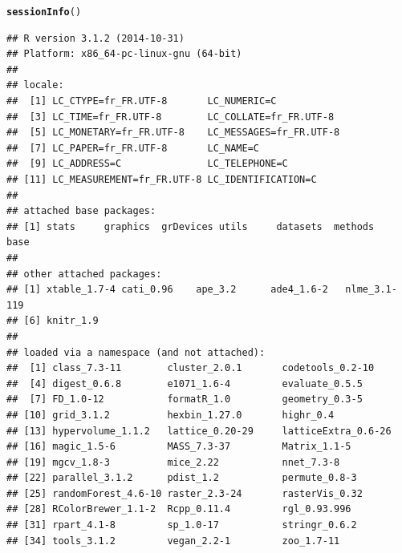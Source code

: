 \documentclass[12pt]{article}\usepackage[]{graphicx}\usepackage[]{color}
\makeatletter
\newcommand{\hlstd}[1]{\textcolor[rgb]{0.345,0.345,0.345}{#1}}%
\newcommand{\hlkwd}[1]{\textcolor[rgb]{0.737,0.353,0.396}{\textbf{#1}}}%
\newenvironment{kframe}{%
 \def\at@end@of@kframe{}%
 \ifinner\ifhmode%
  \def\at@end@of@kframe{\end{minipage}}%
  \begin{minipage}{\columnwidth}%
 \fi\fi%
 \def\FrameCommand##1{\hskip\@totalleftmargin \hskip-\fboxsep
 \colorbox{shadecolor}{##1}\hskip-\fboxsep
     \hskip-\linewidth \hskip-\@totalleftmargin \hskip\columnwidth}%
 \MakeFramed {\advance\hsize-\width
   \@totalleftmargin\z@ \linewidth\hsize
   \@setminipage}}%
 {\par\unskip\endMakeFramed%
 \at@end@of@kframe}
\newenvironment{knitrout}{}{} %
\makeatother
\begin{document}
\begin{knitrout}\small
{}\color{fgcolor}\begin{kframe}
\begin{alltt}
\hlkwd{sessionInfo}\hlstd{()}
\end{alltt}
\begin{verbatim}
## R version 3.1.2 (2014-10-31)
## Platform: x86_64-pc-linux-gnu (64-bit)
## 
## locale:
##  [1] LC_CTYPE=fr_FR.UTF-8       LC_NUMERIC=C              
##  [3] LC_TIME=fr_FR.UTF-8        LC_COLLATE=fr_FR.UTF-8    
##  [5] LC_MONETARY=fr_FR.UTF-8    LC_MESSAGES=fr_FR.UTF-8   
##  [7] LC_PAPER=fr_FR.UTF-8       LC_NAME=C                 
##  [9] LC_ADDRESS=C               LC_TELEPHONE=C            
## [11] LC_MEASUREMENT=fr_FR.UTF-8 LC_IDENTIFICATION=C       
## 
## attached base packages:
## [1] stats     graphics  grDevices utils     datasets  methods   base     
## 
## other attached packages:
## [1] xtable_1.7-4 cati_0.96    ape_3.2      ade4_1.6-2   nlme_3.1-119
## [6] knitr_1.9   
## 
## loaded via a namespace (and not attached):
##  [1] class_7.3-11        cluster_2.0.1       codetools_0.2-10   
##  [4] digest_0.6.8        e1071_1.6-4         evaluate_0.5.5     
##  [7] FD_1.0-12           formatR_1.0         geometry_0.3-5     
## [10] grid_3.1.2          hexbin_1.27.0       highr_0.4          
## [13] hypervolume_1.1.2   lattice_0.20-29     latticeExtra_0.6-26
## [16] magic_1.5-6         MASS_7.3-37         Matrix_1.1-5       
## [19] mgcv_1.8-3          mice_2.22           nnet_7.3-8         
## [22] parallel_3.1.2      pdist_1.2           permute_0.8-3      
## [25] randomForest_4.6-10 raster_2.3-24       rasterVis_0.32     
## [28] RColorBrewer_1.1-2  Rcpp_0.11.4         rgl_0.93.996       
## [31] rpart_4.1-8         sp_1.0-17           stringr_0.6.2      
## [34] tools_3.1.2         vegan_2.2-1         zoo_1.7-11
\end{verbatim}
\end{kframe}
\end{knitrout}
\end{document}
